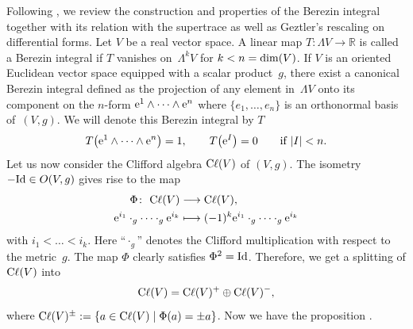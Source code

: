 \documentclass[10pt,a4paper]{amsart}
\numberwithin{equation}{section}
\theoremstyle{definition}
\newcommand{\Cl}{{\rm C}\ell}
\begin{document}
Following \cite[Section~3]{BGV}, we review the construction and properties of the Berezin integral together with its relation with the supertrace as well as Geztler's rescaling on differential forms. Let $V$ be a real vector space. A linear map $T\colon\Lambda V\to \mathbb{R}$ is called a Berezin integral if $T$ vanishes on~$\Lambda^kV$ for $k<n={\rm dim}(V)$. If $V$ is an oriented Euclidean vector space equipped with a scalar product~$g$, there exist a canonical Berezin integral defined as the projection of any element in~$\Lambda V$ onto its component on the $n$-form ${\rm e}^1\wedge \dots \wedge {\rm e}^n$ where $\{e_1,\dots,e_n\}$ is an orthonormal basis of~$(V,g)$. We will denote this Berezin integral by $T$
\[T\bigl({\rm e}^1\wedge \dots \wedge {\rm e}^n\bigr)=1,\qquad T\bigl({\rm e}^I\bigr)=0\qquad \text{if}\ |I|<n.\]
Let us now consider the Clifford algebra $\Cl(V)$ of $(V,g)$. The isometry $-{\rm Id}\in O(V,g)$ gives rise to the map
\begin{align*}
	\Phi\colon \ \Cl(V) &\longrightarrow \Cl(V),\nonumber\\ {\rm e}^{i_1}\cdot_g\cdots\cdot_g {\rm e}^{i_k}&\longmapsto (-1)^k{\rm e}^{i_1}\cdot_g\cdots\cdot_g {\rm e}^{i_k}
\end{align*}
with $i_1<\dots< i_k$. Here ``$\cdot_g$'' denotes the Clifford multiplication with respect to the metric~$g$. The map $\Phi$ clearly satisfies $\Phi^2={\rm Id}$. Therefore, we get a splitting of $\Cl(V)$ into
\[\Cl(V)=\Cl(V)^+\oplus \Cl(V)^-,\]
where $\Cl(V)^\pm:=\{a\in \Cl(V)\mid \Phi(a)=\pm a\}$. Now we have the proposition \cite[Proposition~3.19]{BGV}.
\end{document}
